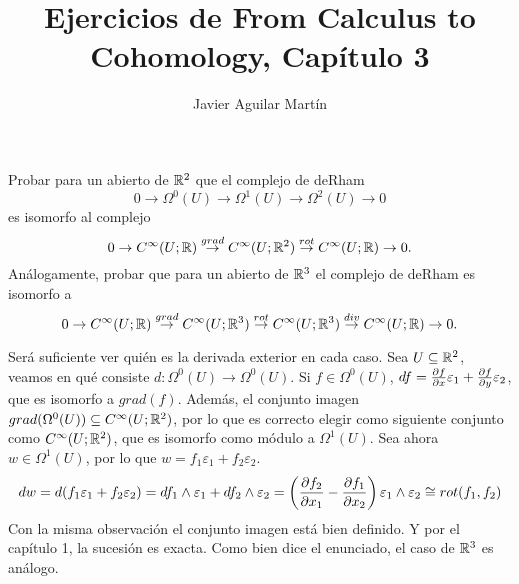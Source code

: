 \documentclass[twoside]{article}
\begin{document}
\title{Ejercicios de From Calculus to Cohomology, Capítulo 3}
\author{Javier Aguilar Martín}
\maketitle


\begin{ejercicio}{3.1}
Probar para un abierto de $\mathbb{R}^2$ que el complejo de deRham
\[
0\to\Omega^0(U)\to\Omega^1(U)\to\Omega^2(U)\to 0
\]
es isomorfo al complejo
\[
0\to C^{\infty}(U;\mathbb{R})\overset{grad}{\to}C^{\infty}(U;\mathbb{R}^2)\overset{rot}{\to}C^{\infty}(U;\mathbb{R})\to 0.
\]
Análogamente, probar que para un abierto de $\mathbb{R}^3$ el complejo de deRham es isomorfo a
\[
0\to C^{\infty}(U;\mathbb{R})\overset{grad}{\to}C^{\infty}(U;\mathbb{R}^3)\overset{rot}{\to}C^{\infty}(U;\mathbb{R}^3)\overset{div}{\to}C^{\infty}(U;\mathbb{R})\to 0.
\]
\end{ejercicio}
\begin{solucion}
Será suficiente ver quién es la derivada exterior en cada caso. Sea $U\subseteq\mathbb{R}^2$, veamos en qué consiste $d:\Omega^0(U)\to\Omega^0(U)$. Si $f\in\Omega^0(U)$, $df=\frac{\partial f}{\partial x}\varepsilon_1+\frac{\partial f}{\partial y}\varepsilon_2$, que es isomorfo a $grad(f)$. Además, el conjunto imagen $grad(\Omega^0(U))\subseteq C^{\infty}(U;\mathbb{R}^2)$, por lo que es correcto elegir como siguiente conjunto como $C^{\infty}(U;\mathbb{R}^2)$, que es isomorfo como módulo a $\Omega^1(U)$. Sea ahora $w\in\Omega^1(U)$, por lo que $w=f_1\varepsilon_1+f_2\varepsilon_2$. 
\[dw=d(f_1\varepsilon_1+f_2\varepsilon_2)=df_1\land\varepsilon_1+df_2\land\varepsilon_2=\left(\frac{\partial f_2}{\partial x_1}-\frac{\partial f_1}{\partial x_2}\right)\varepsilon_1\land\varepsilon_2\cong rot(f_1,f_2)
\]
Con la misma observación el conjunto imagen está bien definido. Y por el capítulo 1, la sucesión es exacta. Como bien dice el enunciado, el caso de $\mathbb{R}^3$ es análogo.
\end{solucion}

\newpage

\begin{ejercicio}{3.2}

\end{ejercicio}
\begin{solucion}
 
\end{solucion}
\newpage

\begin{ejercicio}{3.3}
\end{ejercicio}
\begin{solucion}
\end{solucion}
\newpage
\end{document}
